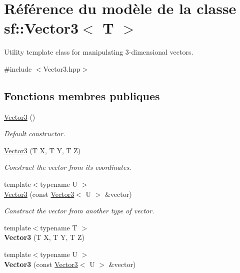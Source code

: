 \hypertarget{classsf_1_1Vector3}{}\section{Référence du modèle de la classe sf\+:\+:Vector3$<$ T $>$}
\label{classsf_1_1Vector3}


Utility template class for manipulating 3-\/dimensional vectors.  




{\ttfamily \#include $<$Vector3.\+hpp$>$}

\subsection*{Fonctions membres publiques}
\begin{DoxyCompactItemize}
\item 
\hyperlink{classsf_1_1Vector3_aee8be1985c6e45e381ad4071265636f9}{Vector3} ()
\begin{DoxyCompactList}\small\item\em Default constructor. \end{DoxyCompactList}\item 
\hyperlink{classsf_1_1Vector3_a99ed75b68f58adfa3e9fa0561b424bf6}{Vector3} (T X, T Y, T Z)
\begin{DoxyCompactList}\small\item\em Construct the vector from its coordinates. \end{DoxyCompactList}\item 
{\footnotesize template$<$typename U $>$ }\\\hyperlink{classsf_1_1Vector3_adb2b2e150025e97ccfa96219bbed59d1}{Vector3} (const \hyperlink{classsf_1_1Vector3}{Vector3}$<$ U $>$ \&vector)
\begin{DoxyCompactList}\small\item\em Construct the vector from another type of vector. \end{DoxyCompactList}\item 
\mbox{\label{classsf_1_1Vector3_a6d71676baa113af029006c01620fd4ca}} 
{\footnotesize template$<$typename T $>$ }\\{\bfseries Vector3} (T X, T Y, T Z)
\item 
\mbox{\label{classsf_1_1Vector3_adb2b2e150025e97ccfa96219bbed59d1}} 
{\footnotesize template$<$typename U $>$ }\\{\bfseries Vector3} (const \hyperlink{classsf_1_1Vector3}{Vector3}$<$ U $>$ \&vector)
\end{DoxyCompactItemize}
